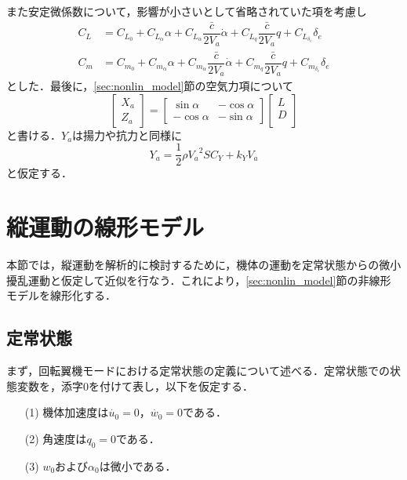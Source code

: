 また安定微係数について，影響が小さいとして省略されていた項を考慮し
\begin{align}
  C_L &= C_{L_0}+C_{L_\alpha}\alpha+C_{L_{\dot{\alpha}}}\dfrac{\bar{c}}{2V_a}\dot{\alpha}+C_{L_q}\dfrac{\bar{c}}{2V_a}q+C_{L_{\delta_e}}\delta_e \\[5pt]
  C_m &= C_{m_0}+C_{m_\alpha}\alpha+C_{m_{\dot{\alpha}}}\dfrac{\bar{c}}{2V_a}\dot{\alpha}+C_{m_q}\dfrac{\bar{c}}{2V_a}q+C_{m_{\delta_e}}\delta_e
\end{align}
とした．最後に，\ref{sec:nonlin_model}節の空気力項について
\begin{equation}
  \left[
  \begin{array}{ccc}
    X_a \\
    Z_a
  \end{array}
  \right] =
  \left[
  \begin{array}{ccc}
    \sin\alpha & -\cos\alpha \\
    -\cos\alpha & -\sin\alpha
  \end{array}
  \right]
  \left[
  \begin{array}{ccc}
    L \\
    D \\
  \end{array}
  \right]
  \label{eq:XZ_to_LD}
\end{equation}
と書ける．$Y_a$は揚力や抗力と同様に
\begin{equation}
  Y_a = \dfrac{1}{2}\rho {V_a}^2 S C_Y + k_Y V_a
\end{equation}
と仮定する．

\section{縦運動の線形モデル}
本節では，縦運動を解析的に検討するために，機体の運動を定常状態からの微小擾乱運動と仮定して近似を行なう．これにより，\ref{sec:nonlin_model}節の非線形モデルを線形化する．

\subsection{定常状態}
\label{sec:steady}

まず，回転翼機モードにおける定常状態の定義について述べる．定常状態での状態変数を，添字0を付けて表し，以下を仮定する．
	\begin{itemize}
	\item[(1)]機体加速度は$\dot{u_0} = 0$，$\dot{w_0} = 0$である．
	\item[(2)]角速度は$q_0 = 0$である．
  \item[(3)]$w_0$および$\alpha_0$は微小である．
	\end{itemize}

